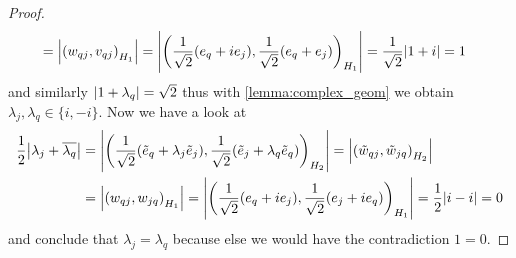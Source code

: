 \begin{proof}
\begin{align*}
		&= {\left | {\left ( w_{qj}, v_{qj} \right )}_{H_1} \right |} = {\left | {\left ( \frac{1}{\sqrt{2}}(e_q + ie_j), \frac{1}{\sqrt{2}} (e_q + e_j) \right )}_{H_1} \right |} = \frac{1}{\sqrt{2}} {\left | 1 + i \right |} = 1
	\end{align*}
	and similarly ${\left | 1 + \lambda_q \right |} = \sqrt{2}$ thus with \ref{lemma:complex_geom} we obtain $\lambda_j, \lambda_q \in \{i, -i\}$. Now we have a look at
	\begin{align*}
		\frac{1}{2}{\left | \lambda_j + \overline{\lambda_q} \right |} &= {\left | {\left ( \frac{1}{\sqrt{2}}(\tilde{e}_q + \lambda_j \tilde{e}_j), \frac{1}{\sqrt{2}}(\tilde{e}_j + \lambda_{q} \tilde{e}_q) \right )}_{H_2} \right |} = {\left | {\left ( \tilde{w}_{qj}, \tilde{w}_{jq} \right )}_{H_2} \right |} \\
		&= {\left | {\left ( w_{qj}, w_{jq} \right )}_{H_1} \right |} = {\left | {\left ( \frac{1}{\sqrt{2}}(e_q + i e_j), \frac{1}{\sqrt{2}}(e_j + i e_q) \right )}_{H_1} \right |} = \frac{1}{2}{\left | i - i \right |} = 0
	\end{align*}
	and conclude that $\lambda_j = \lambda_q$ because else we would have the contradiction $1 = 0$. 
\end{proof}


